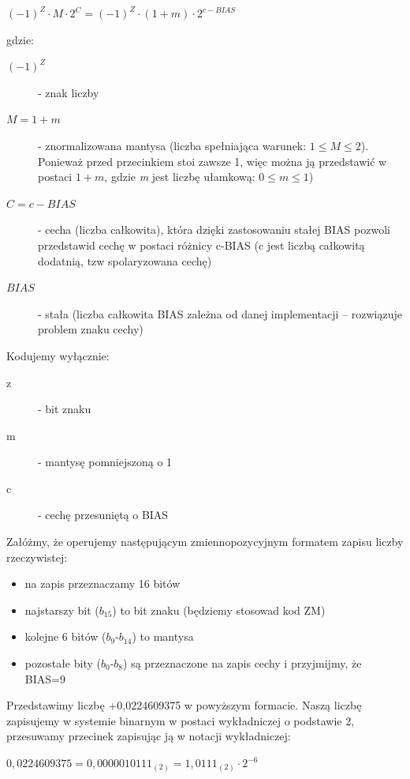 \documentclass[a4paper,12pt,oneside]{book}
\begin{document}
				\begin{center}
					$(-1)^Z \cdot M \cdot 2^C = (-1)^Z \cdot (1+m) \cdot 2^{c - BIAS}$
				\end{center}
				gdzie:
				\begin{description}
					\item[$(-1)^Z$] - znak liczby
					\item[$M=1+m$] - znormalizowana mantysa (liczba spełniająca warunek: $1 \leq M \leq 2$). Ponieważ przed przecinkiem stoi zawsze 1, więc można ją przedstawić w postaci $1+m$, gdzie \emph{m} jest liczbę ułamkową: $0 \leq m \leq 1$)
					\item[$C=c-BIAS$] - cecha (liczba całkowita), która dzięki zastosowaniu stałej BIAS pozwoli przedstawid cechę w postaci
					różnicy c-BIAS (c jest liczbą całkowitą dodatnią, tzw spolaryzowana cechę)
					\item[$BIAS$] - stała (liczba całkowita BIAS zależna od danej implementacji – rozwiązuje problem znaku cechy)
				\end{description}
				Kodujemy wyłącznie:
				\begin{description}
					\item[z] - bit znaku
					\item[m] - mantysę pomniejszoną o 1
					\item[c] - cechę przesuniętą o BIAS
				\end{description}
				
				Załóżmy, że operujemy następującym zmiennopozycyjnym formatem zapisu liczby rzeczywistej:
				\begin{itemize}
					\item na zapis przeznaczamy 16 bitów
					\item najstarszy bit ($b_{15}$) to bit znaku (będziemy stosowad kod ZM)
					\item kolejne 6 bitów ($b_{9}$-$b_{14}$) to mantysa
					\item pozostałe bity ($b_0$-$b_8$) są przeznaczone na zapis cechy i przyjmijmy, że BIAS=9
				\end{itemize}
				
				Przedstawimy liczbę +0,0224609375 w powyższym formacie. Naszą liczbę zapisujemy w systemie binarnym w
				postaci wykładniczej o podstawie 2, przesuwamy przecinek zapisując ją w notacji wykładniczej:
				
				\begin{center}
					$0,0224609375 = 0,0000010111_{(2)} = 1,0111_{(2)} \cdot 2^{-6}$
				\end{center}
				
\end{document}
